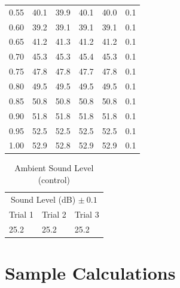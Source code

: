 \documentclass[index]{subfiles}
\begin{document}
\begin{table}[H]
\begin{tabular}{@{}cccccc@{}}
        0.55                                 & 40.1                                              & 39.9    & 40.1    & 40.0    & 0.1         \\
        0.60                                 & 39.2                                              & 39.1    & 39.1    & 39.1    & 0.1         \\
        0.65                                 & 41.2                                              & 41.3    & 41.2    & 41.2    & 0.1         \\
        0.70                                 & 45.3                                              & 45.3    & 45.4    & 45.3    & 0.1         \\
        0.75                                 & 47.8                                              & 47.8    & 47.7    & 47.8    & 0.1         \\
        0.80                                 & 49.5                                              & 49.5    & 49.5    & 49.5    & 0.1         \\
        0.85                                 & 50.8                                              & 50.8    & 50.8    & 50.8    & 0.1         \\
        0.90                                 & 51.8                                              & 51.8    & 51.8    & 51.8    & 0.1         \\
        0.95                                 & 52.5                                              & 52.5    & 52.5    & 52.5    & 0.1         \\
        1.00                                 & 52.9                                              & 52.8    & 52.9    & 52.9    & 0.1
    \end{tabular}
\end{table}

\begin{table}[H]
    \caption{Ambient Sound Level (control)}
    \centering
    \begin{tabular}{@{}lll@{}} \toprule
        \multicolumn{3}{c}{Sound Level (dB) \(\pm\ 0.1\) } \\ \cmidrule(r){1-3}
        Trial 1 & Trial 2 & Trial 3                        \\ \midrule
        25.2    & 25.2    & 25.2
    \end{tabular}

\end{table}

\section{Sample Calculations}
\end{document}
